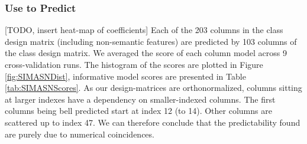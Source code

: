 \subsubsection{Use  to Predict }
[TODO, insert heat-map of coefficients]
Each of the 203 columns in the  class design matrix (including non-semantic features) are predicted by 103 columns of the  class design matrix. We averaged the  score of each column model across 9 cross-validation runs. The histogram of the scores are plotted in Figure \ref{fig:SIMASNDist}, informative model scores are presented in Table \ref{tab:SIMASNScores}. As our design-matrices are orthonormalized, columns sitting at larger indexes have a dependency on smaller-indexed columns. The first columns being bell predicted start at index 12 (to 14). Other columns are scattered up to index 47. We can therefore conclude that the predictability found are purely due to numerical coincidences.

